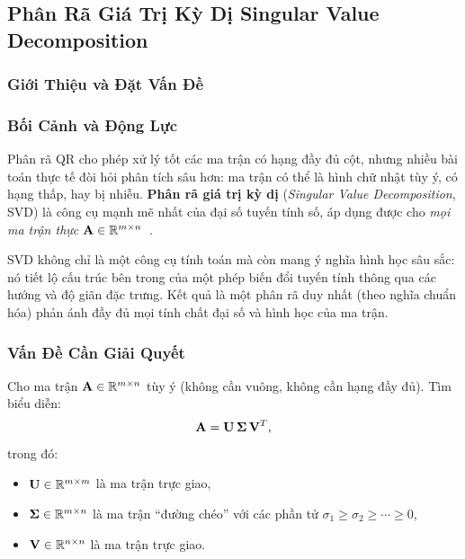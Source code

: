 \subsection{Phân Rã Giá Trị Kỳ Dị \- Singular Value Decomposition}
\subsubsection{Giới Thiệu và Đặt Vấn Đề}

\subsubsection{Bối Cảnh và Động Lực}

Phân rã QR cho phép xử lý tốt các ma trận có hạng đầy đủ cột, nhưng nhiều bài toán
thực tế đòi hỏi phân tích sâu hơn: ma trận có thể là hình chữ nhật tùy ý, có hạng
thấp, hay bị nhiễu. \textbf{Phân rã giá trị kỳ dị} (\textit{Singular Value
Decomposition}, SVD) là công cụ mạnh mẽ nhất của đại số tuyến tính số, áp dụng
được cho \emph{mọi ma trận thực} $\mathbf{A} \in \mathbb{R}^{m \times n}$~\cite{trefethen1997}.

SVD không chỉ là một công cụ tính toán mà còn mang ý nghĩa hình học sâu sắc: nó
tiết lộ cấu trúc bên trong của một phép biến đổi tuyến tính thông qua các hướng
và độ giãn đặc trưng. Kết quả là một phân rã duy nhất (theo nghĩa chuẩn hóa) phản
ánh đầy đủ mọi tính chất đại số và hình học của ma trận.

\subsubsection{Vấn Đề Cần Giải Quyết}

\begin{tcolorbox}[enhanced, colback=blue!8!white, colframe=primaryblue,
    title=\textbf{Bài toán tổng quát}, fonttitle=\bfseries]
Cho ma trận $\mathbf{A} \in \mathbb{R}^{m \times n}$ tùy ý (không cần vuông, không cần
hạng đầy đủ). Tìm biểu diễn:
\[
    \mathbf{A} = \mathbf{U}\,\boldsymbol{\Sigma}\,\mathbf{V}^T,
\]
trong đó:
\begin{itemize}[noitemsep]
    \item $\mathbf{U} \in \mathbb{R}^{m \times m}$ là ma trận trực giao,
    \item $\boldsymbol{\Sigma} \in \mathbb{R}^{m \times n}$ là ma trận ``đường chéo'' với
          các phần tử $\sigma_1 \geq \sigma_2 \geq \cdots \geq 0$,
    \item $\mathbf{V} \in \mathbb{R}^{n \times n}$ là ma trận trực giao.
\end{itemize}
\end{tcolorbox}

